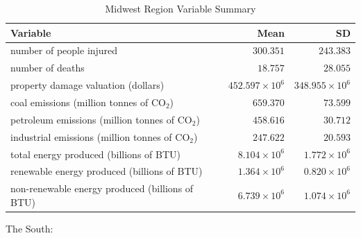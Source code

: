 \documentclass[10pt,]{article}
\begin{document}
\begin{center}
  \begin{table}[h!]
  \caption{\label{tab:table-name}Midwest Region Variable Summary}
  \smallskip
  \begin{center}
  \begin{tabular}{|l r r|}
  \hline
  Variable & Mean & SD \\ [0.5ex] 
  \hline\hline
  number of people injured & $300.351$ & $243.383$ \\ 
  \hline
  number of deaths & $18.757$ & $28.055$ \\
  \hline
  property damage valuation (dollars) & $452.597 \times 10^6$ & $348.955 \times 10^6$ \\
  \hline
  coal emissions (million tonnes of CO$_2$) & $659.370$ & $73.599$ \\
  \hline
  petroleum emissions (million tonnes of CO$_2$) & $458.616$ & $30.712$ \\
  \hline
  industrial emissions (million tonnes of CO$_2$) & $247.622$ & $20.593$ \\ 
  \hline
  total energy produced (billions of BTU) & $8.104 \times 10^6$ & $1.772 \times 10^6$ \\
  \hline
  renewable energy produced (billions of BTU) & $1.364 \times 10^6$ & $0.820 \times 10^6$ \\
  \hline
  non-renewable energy produced (billions of BTU) & $6.739 \times 10^6$ & $1.074 \times 10^6$ \\
  \hline
  \end{tabular}
  \end{center}
  \end{table}
\end{center}

\newpage

The South:
\end{document}
